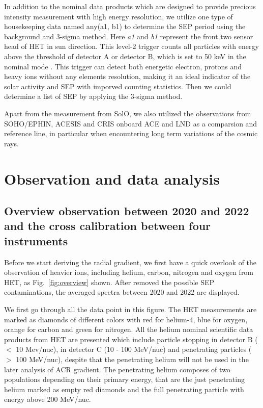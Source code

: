 In addition to the nominal data products which are designed to provide precious intensity measurement with high energy resolution, we utilize one type of housekeeping data named any(a1, b1) to determine the \ac{SEP} period using the background and 3-sigma method. Here \textit{a1} and \textit{b1} represent the front two sensor head of \ac{HET} in sun direction. This level-2 trigger counts all  particles with energy above the threshold of detector A or detector B, which is set to 50 keV in the nominal mode \citep{Elftmann-2020-PhD}. This trigger can detect both energetic electron, protons and heavy ions without any elements resolution, making it an ideal indicator of the solar activity and \ac{SEP} with imporved counting statistics. Then we could determine a list of \ac{SEP} by applying the 3-sigma method.

Apart from the measurement from \ac{SolO}, we also utilized the observations from \ac{SOHO}/\ac{EPHIN}, \ac{ACESIS} and \ac{CRIS} onboard \ac{ACE} and \ac{LND} as a comparsion and reference line, in particular when encountering long term variations of the cosmic rays.

\section{Observation and data analysis}

\subsection{Overview observation between 2020 and 2022 and the cross calibration between four instruments}

Before we start deriving the radial gradient, we first have a quick overlook of the observation of heavier ions, including helium, carbon, nitrogen and oxygen from \ac{HET}, as Fig.~\ref{fig:overview} shown. After removed the possible \ac{SEP} contaminations, the averaged spectra between 2020 and 2022 are displayed.

We first go through all the data point in this figure.
The \ac{HET} measurements are marked as diamonds of different colors with red for helium-4, blue for oxygen, orange for carbon and green for nitrogen.
All the helium nominal scientific data products from \ac{HET} are presented which include particle stopping in detector B ($<$ 10 Mev/nuc), in detector C (10 - 100 MeV/nuc) and penetrating particles ($>$ 100 MeV/nuc), despite that the penetrating helium will not be used in the later analysis of \ac{ACR} gradient.
The penetrating helium composes of two populations depending on their primary energy, that are the just penetrating helium marked as empty red diamonds and the full penetrating particle with energy above 200 MeV/nuc. 

